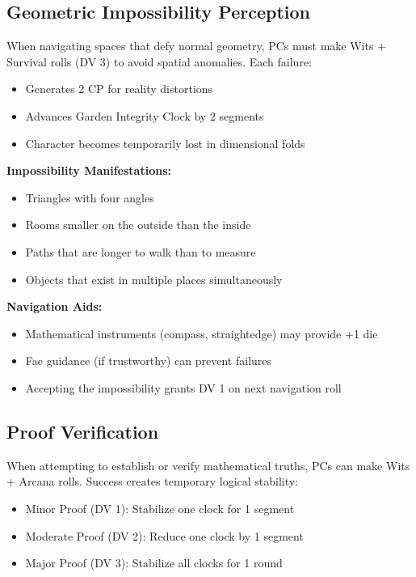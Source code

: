 \documentclass[11pt]{article}
\begin{document}
\subsection{Geometric Impossibility Perception}

When navigating spaces that defy normal geometry, PCs must make Wits + Survival rolls (DV 3) to avoid spatial anomalies. Each failure:
\begin{itemize}
\item Generates 2 CP for reality distortions
\item Advances Garden Integrity Clock by 2 segments
\item Character becomes temporarily lost in dimensional folds
\end{itemize}

\textbf{Impossibility Manifestations:}
\begin{itemize}
\item Triangles with four angles
\item Rooms smaller on the outside than the inside
\item Paths that are longer to walk than to measure
\item Objects that exist in multiple places simultaneously
\end{itemize}

\textbf{Navigation Aids:}
\begin{itemize}
\item Mathematical instruments (compass, straightedge) may provide +1 die
\item Fae guidance (if trustworthy) can prevent failures
\item Accepting the impossibility grants DV 1 on next navigation roll
\end{itemize}

\subsection{Proof Verification}

When attempting to establish or verify mathematical truths, PCs can make Wits + Arcana rolls. Success creates temporary logical stability:
\begin{itemize}
\item Minor Proof (DV 1): Stabilize one clock for 1 segment
\item Moderate Proof (DV 2): Reduce one clock by 1 segment
\item Major Proof (DV 3): Stabilize all clocks for 1 round
\end{itemize}
\end{document}
